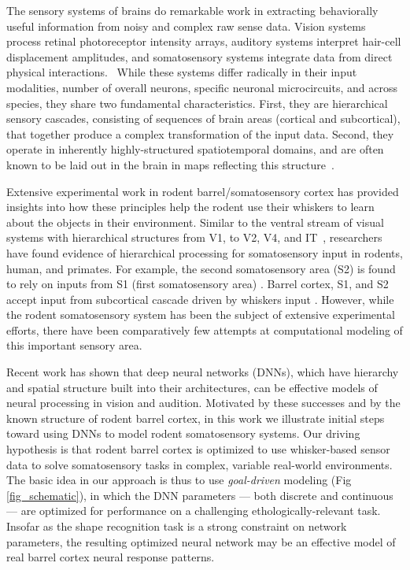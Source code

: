 The sensory systems of brains do remarkable work in extracting behaviorally useful information from noisy and complex raw sense data. 
Vision systems process retinal photoreceptor intensity arrays, auditory systems interpret hair-cell displacement amplitudes, and somatosensory systems integrate data from direct physical interactions.~\cite{purves2001neuroscience} 
While these systems differ radically in their input modalities, number of overall neurons, specific neuronal microcircuits, and across species, they share two fundamental characteristics. 
First, they are hierarchical sensory cascades, consisting of sequences of brain areas (cortical and subcortical), that together produce a complex transformation of the input data.  
Second, they operate in inherently highly-structured spatiotemporal domains, and are often known to be laid out in the brain in maps reflecting this structure~\cite{felleman1991distributed}.

Extensive experimental work in rodent barrel/somatosensory cortex has provided insights into how these principles help the rodent use their whiskers to learn about the objects in their environment.  
Similar to the ventral stream of visual systems with hierarchical structures from V1, to V2, V4, and IT~\cite{felleman1991distributed, Goodale1992}, researchers have found evidence of hierarchical processing for somatosensory input in rodents, human, and primates\cite{Pons1987, Inui2004, Iwamura1998}. 
For example, the second somatosensory area (S2) is found to rely on inputs from S1 (first somatosensory area) \cite{Pons1987, Petersen2007}. 
Barrel cortex, S1, and S2 accept input from subcortical cascade driven by  whiskers input \cite{Diamond2008}. 
However, while the rodent somatosensory system has been the subject of extensive experimental efforts\cite{armstrong1992flow, petersen2003spatiotemporal, kerr2007spatial, von2007neuronal}, there have been comparatively few attempts at computational modeling of this important sensory area. 

Recent work has shown that deep neural networks (DNNs), which have hierarchy and spatial structure built into their architectures, can be effective models of neural processing in vision\cite{cadieu2014deep, Yamins2014} and audition\cite{kell_yamins_sfn}.
Motivated by these successes and by the known structure of rodent barrel cortex, in this work we illustrate initial steps toward using DNNs to model rodent somatosensory systems.
Our driving hypothesis is that rodent barrel cortex is optimized to use whisker-based sensor data to solve somatosensory tasks in complex, variable real-world environments. 
The basic idea in our approach is thus to use \emph{goal-driven} modeling (Fig \ref{fig_schematic}), in which the DNN parameters --- both discrete and continuous --- are optimized for performance on a challenging ethologically-relevant task\cite{yamins2016using}.  
Insofar as the shape recognition task is a strong constraint on network parameters, the resulting optimized neural network may be an effective model of real barrel cortex neural response patterns. 
 
